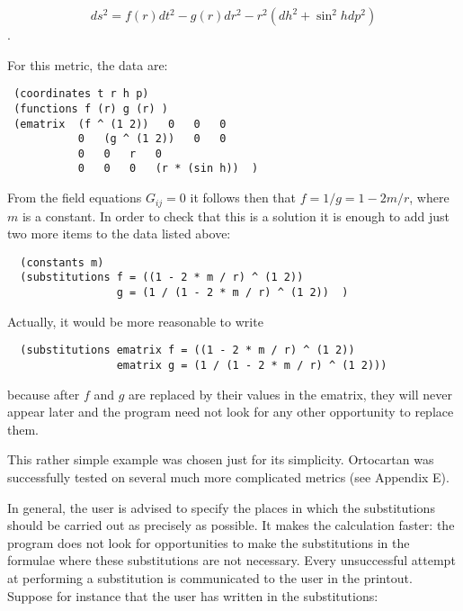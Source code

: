 $$ ds^2 = f(r) dt^2 - g(r) dr^2 - r^2(dh^2 + \sin^2 h dp^2)$$.

\noindent For this metric, the data are:

\bigskip

\begin{verbatim}
 (coordinates t r h p)
 (functions f (r) g (r) )
 (ematrix  (f ^ (1 2))   0   0   0
           0   (g ^ (1 2))   0   0
           0   0   r   0
           0   0   0   (r * (sin h))  )
\end{verbatim}

\bigskip

\noindent From the field equations $G_{ij} = 0$ it follows then that $f = 1/g =
1 - 2m/r$, where $m$ is a constant. In order to check that
     this  is  a solution it is enough to add just two more items
     to the data listed above:

\bigskip

\begin{verbatim}
  (constants m)
  (substitutions f = ((1 - 2 * m / r) ^ (1 2))
                 g = (1 / (1 - 2 * m / r) ^ (1 2))  )
\end{verbatim}

\bigskip

\noindent Actually, it would be more reasonable to write

\bigskip

\begin{verbatim}
  (substitutions ematrix f = ((1 - 2 * m / r) ^ (1 2))
                 ematrix g = (1 / (1 - 2 * m / r) ^ (1 2)))
\end{verbatim}

\bigskip

\noindent because after $f$ and $g$ are replaced by their  values  in  the
     ematrix,  they  will never appear later and the program need
     not look for any other opportunity to replace them.

This rather simple example was chosen just for its simplicity. Ortocartan was
successfully tested on several  much
     more complicated metrics (see Appendix E).

In general, the user is advised to specify  the  places
     in  which the substitutions should be carried out as precisely
     as possible. It makes the calculation  faster:  the  program
     does not look for opportunities to make the substitutions in
     the formulae where these substitutions  are  not  necessary.
     Every  unsuccessful  attempt at performing a substitution is
communicated to the user in the printout.  Suppose  for  instance that the user
has written in the substitutions:

